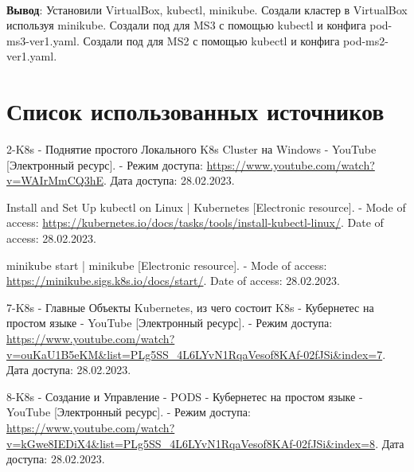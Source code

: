\documentclass[12pt, a4paper, simple]{eskdtext}
\begin{document}
  \paragraph{} \textbf{Вывод}:
  Установили VirtualBox, kubectl, minikube.
  Создали кластер в VirtualBox используя minikube.
  Создали под для MS3 с помощью kubectl и конфига pod-ms3-ver1.yaml.
  Создали под для MS2 с помощью kubectl и конфига pod-ms2-ver1.yaml.

  \begingroup
    \section*{Список использованных источников} %

    \renewcommand{\addcontentsline}[3]{}%
    \renewcommand{\section}[2]{}%

    \begin{thebibliography}{}

      2-K8s - Поднятие простого Локального K8s Cluster на Windows - YouTube
      [Электронный ресурс]. -
      Режим доступа:
      \url{https://www.youtube.com/watch?v=WAIrMmCQ3hE}.
      Дата доступа: 28.02.2023.

      Install and Set Up kubectl on Linux | Kubernetes
      [Electronic resource]. -
      Mode of access:
      \url{https://kubernetes.io/docs/tasks/tools/install-kubectl-linux/}.
      Date of access: 28.02.2023.

      minikube start | minikube
      [Electronic resource]. -
      Mode of access:
      \url{https://minikube.sigs.k8s.io/docs/start/}.
      Date of access: 28.02.2023.

      7-K8s - Главные Объекты Kubernetes, из чего состоит K8s - Кубернетес на простом языке - YouTube
      [Электронный ресурс]. -
      Режим доступа:
      \url{https://www.youtube.com/watch?v=ouKaU1B5eKM&list=PLg5SS_4L6LYvN1RqaVesof8KAf-02fJSi&index=7}.
      Дата доступа: 28.02.2023.

      8-K8s - Создание и Управление - PODS - Кубернетес на простом языке - YouTube
      [Электронный ресурс]. -
      Режим доступа:
      \url{https://www.youtube.com/watch?v=kGwe8IEDiX4&list=PLg5SS_4L6LYvN1RqaVesof8KAf-02fJSi&index=8}.
      Дата доступа: 28.02.2023.

    \end{thebibliography}
  \endgroup
\end{document}
